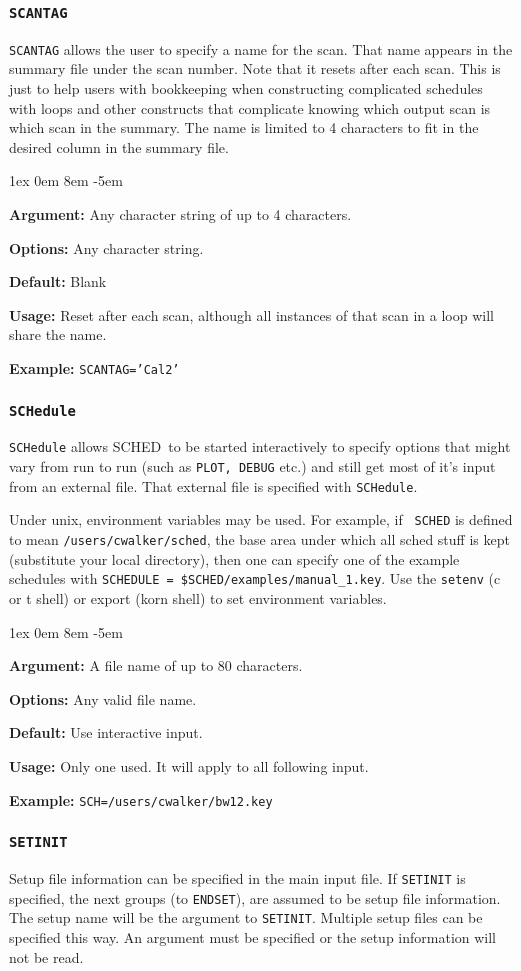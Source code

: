 \documentclass{report}
\newcommand{\schedb}{{\sc SCHED~}}
\newcommand{\rcwbox}[5]{
  \begin{list}{}{\parsep 1ex  \itemsep 0em
                 \leftmargin 8em  \itemindent -5em }
    \item {\bf Argument:} #1
    \item {\bf Options:}  #2
    \item {\bf Default:}  #3
    \item {\bf Usage:}    #4
    \item {\bf Example:}  #5
  \end{list}
}
\begin{document}
\subsubsection{\label{MP:SCANTAG}\tt SCANTAG}

{\tt SCANTAG} allows the user to specify a name for the scan.  That
name appears in the summary file under the scan number.  Note that
it resets after each scan.  This is just to help users with bookkeeping
when constructing complicated schedules with loops and other constructs
that complicate knowing which output scan is which scan in the
summary.  The name is limited to 4 characters to fit in the desired
column in the summary file.

\rcwbox
{Any character string of up to 4 characters.}
{Any character string.}
{Blank}
{Reset after each scan, although all instances of that scan in a
loop will share the name.}
{{\tt SCANTAG='Cal2'}}


\subsubsection{\label{MP:SCHEDULE}\tt SCHedule}

{\tt SCHedule} allows \schedb to be started interactively to
specify options that might vary from run to run (such as {\tt PLOT,
DEBUG} etc.) and still get most of it's input from an
external file.  That external file is specified with {\tt SCHedule}.

Under unix, environment variables may be used.  For example, if {\tt
SCHED} is defined to mean {\tt /users/cwalker/sched}, the base
area under which all sched stuff is kept (substitute your local
directory), then one can specify one of the example schedules with
{\tt SCHEDULE = \$SCHED/examples/manual\_1.key}.  Use the {\tt setenv}
(c or t shell) or export (korn shell) to set environment variables.

\rcwbox
{A file name of up to 80 characters.}
{Any valid file name.}
{Use interactive input.}
{Only one used. It will apply to all following input.}
{{\tt SCH=/users/cwalker/bw12.key}}


\subsubsection{\label{MP:SETINIT}{\tt SETINIT}}

Setup file information can be specified in the main input file.  If
{\tt SETINIT} is specified, the next groups (to {\tt ENDSET}), are
assumed to be setup file information.  The setup name will be the
argument to {\tt SETINIT}.  Multiple setup files can be specified
this way.  An argument must be specified or the setup information
will not be read.
\end{document}
